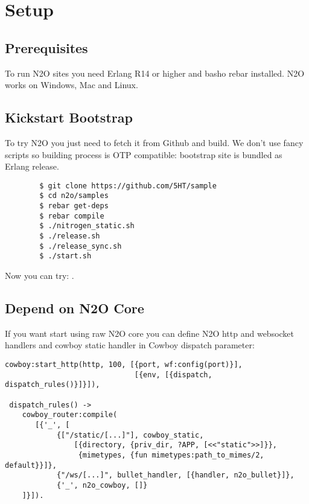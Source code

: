 \section{Setup}

\subsection{Prerequisites}
To run N2O sites you need Erlang R14 or higher and basho rebar installed.
N2O works on Windows, Mac and Linux.

\subsection{Kickstart Bootstrap}
To try N2O you just need to fetch it from Github and build. We don't use
fancy scripts so building process is OTP compatible: bootstrap site
is bundled as Erlang release.

\vspace{1\baselineskip}
\begin{lstlisting}
        $ git clone https://github.com/5HT/sample
        $ cd n2o/samples
        $ rebar get-deps
        $ rebar compile
        $ ./nitrogen_static.sh
        $ ./release.sh
        $ ./release_sync.sh
        $ ./start.sh
\end{lstlisting}
\vspace{1\baselineskip}

Now you can try: .

\newpage
\subsection{Depend on N2O Core}
If you want start using raw N2O core you can define N2O http and websocket handlers and cowboy static
handler in Cowboy dispatch parameter:

\begin{lstlisting}[caption=web\_sup.erl]
 cowboy:start_http(http, 100, [{port, wf:config(port)}],
                              [{env, [{dispatch, dispatch_rules()}]}]),

 dispatch_rules() ->
    cowboy_router:compile(
       [{'_', [
            {["/static/[...]"], cowboy_static,
                [{directory, {priv_dir, ?APP, [<<"static">>]}},
                 {mimetypes, {fun mimetypes:path_to_mimes/2, default}}]}, 
            {"/ws/[...]", bullet_handler, [{handler, n2o_bullet}]},
            {'_', n2o_cowboy, []}
    ]}]).
\end{lstlisting}

